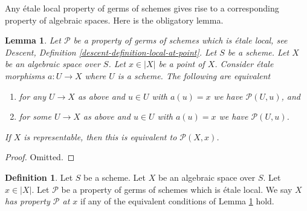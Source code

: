 \documentclass{stacks-project}
\theoremstyle{plain}
\newtheorem{lemma}[subsection]{Lemma}
\theoremstyle{definition}
\newtheorem{definition}[subsection]{Definition}
\theoremstyle{remark}
\numberwithin{equation}{subsection}
\begin{document}
\noindent
Any \'etale local property of germs of schemes gives rise to a corresponding
property of algebraic spaces. Here is the obligatory lemma.

\begin{lemma}
\label{lemma-local-source-target-at-point}
Let $\mathcal{P}$ be a property of germs of schemes which is \'etale local, see
Descent, Definition \ref{descent-definition-local-at-point}.
Let $S$ be a scheme.
Let $X$ be an algebraic space over $S$.
Let $x \in |X|$ be a point of $X$.
Consider \'etale morphisms $a : U \to X$ where $U$ is a scheme.
The following are equivalent
\begin{enumerate}
\item for any $U \to X$ as above and $u \in U$ with $a(u) = x$ we have
$\mathcal{P}(U, u)$, and
\item for some $U \to X$ as above and $u \in U$ with $a(u) = x$ we have
$\mathcal{P}(U, u)$.
\end{enumerate}
If $X$ is representable, then this is equivalent to $\mathcal{P}(X, x)$.
\end{lemma}

\begin{proof}
Omitted.
\end{proof}

\begin{definition}
\label{definition-property-at-point}
Let $S$ be a scheme. Let $X$ be an algebraic space over $S$.
Let $x \in |X|$. Let $\mathcal{P}$ be a property of germs of schemes which is
\'etale local.
We say $X$ {\it has property $\mathcal{P}$ at $x$} if any of the
equivalent conditions of
Lemma \ref{lemma-local-source-target-at-point}
hold.
\end{definition}
\end{document}

